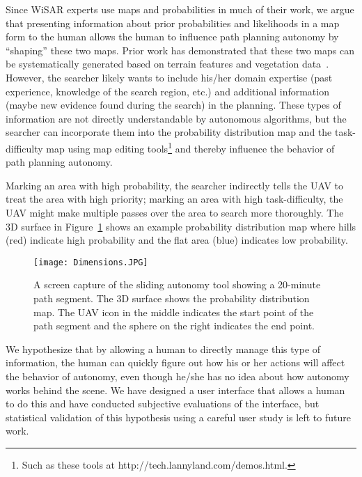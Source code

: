 Since WiSAR experts use maps and probabilities in much of their work, we argue that presenting information about prior probabilities and likelihoods in a map form to the human allows the human to influence path planning autonomy by ``shaping'' these two maps. Prior work has demonstrated that these two maps can be systematically generated based on terrain features and vegetation data~\cite{Lin2010Bayesian, Lin2014Hierarchical}. However, the searcher likely wants to include his/her domain expertise (past experience, knowledge of the search region, etc.) and additional information (maybe new evidence found during the search) in the planning. These types of information are not directly understandable by autonomous algorithms, but the searcher can incorporate them into the probability distribution map and the task-difficulty map using map editing tools\footnote{Such as these tools at http://tech.lannyland.com/demos.html.} and thereby influence the behavior of path planning autonomy.

Marking an area with high probability, the searcher indirectly tells the UAV to treat the area with high priority; marking an area with high task-difficulty, the UAV might make multiple passes over the area to search more thoroughly. The 3D surface in Figure~\ref{dimensions6} shows an example probability distribution map where hills (red) indicate high probability and the flat area (blue) indicates low probability.

\begin{figure}
\centering
\texttt{[image: Dimensions.JPG]}
\caption[A screen capture of the sliding autonomy tool showing a path segment]{A screen capture of the sliding autonomy tool showing a 20-minute path segment. The 3D surface shows the probability distribution map. The UAV icon in the middle indicates the start point of the path segment and the sphere on the right indicates the end point.}
\label{dimensions6}
\end{figure}

We hypothesize that by allowing a human to directly manage this type of information, the human can quickly figure out how his or her actions will affect the behavior of autonomy, even though he/she has no idea about how autonomy works behind the scene. We have designed a user interface that allows a human to do this and have conducted subjective evaluations of the interface, but statistical validation of this hypothesis using a careful user study is left to future work.

